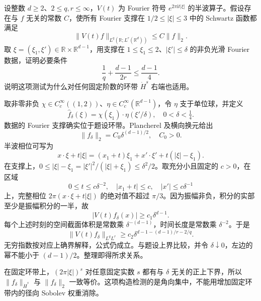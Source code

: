\begin{exercise}\label{b2:ex:app-E-2}
设整数 \(d\geq2\)、\(2\leq q,r\leq\infty\)，\(V(t)\) 为 Fourier 符号 \(e^{2\pi\mathrm it|\xi|}\) 的半波算子。假设存在与 \(f\) 无关的常数 \(C\)，使所有 Fourier 支撑在 \(1/2\leq|\xi|\leq3\) 中的 Schwartz 函数都满足
\[
 \|V(t)f\|_{L^q(\mathbb R;L^r(\mathbb R^d))}\leq C\|f\|_2.
\]
取 \(\xi=(\xi_1,\xi')\in\mathbb R\times\mathbb R^{d-1}\)，用支撑在 \(1\leq\xi_1\leq2\)、\(|\xi'|\leq\delta\) 的非负光滑 Fourier 数据，证明必要条件
\[
 \frac1q+\frac{d-1}{2r}\leq\frac{d-1}{4}.
\]
说明这项测试为什么对任何固定阶数的环带 \(\dot H^s\) 右端也适用。
\end{exercise}
\begin{solution}
取非零非负 \(\chi\in C_c^\infty((1,2))\)、\(\eta\in C_c^\infty(\mathbb R^{d-1})\)，令 \(\eta\) 支于单位球，并定义
\[
 \widehat f_\delta(\xi)=\chi(\xi_1)\cdot\eta(\xi'/\delta),
 \quad 0<\delta<\tfrac14.
\]
数据的 Fourier 支撑确实位于题设环带。Plancherel 及横向换元给出
\[
 \|f_\delta\|_2=C_0\delta^{(d-1)/2},\quad C_0>0.
\]
半波相位可写为
\[
 x\cdot\xi+t|\xi|
 =(x_1+t)\xi_1+x'\cdot\xi'
       +t(|\xi|-\xi_1).
\]
在支撑上，\(0\leq|\xi|-\xi_1=|\xi'|^2/(|\xi|+\xi_1)\leq\delta^2/2\)。取充分小且固定的 \(c>0\)，在区域
\[
 0\leq t\leq c\delta^{-2},\quad
 |x_1+t|\leq c,\quad |x'|\leq c\delta^{-1}
\]
上，完整相位 \(2\pi(x\cdot\xi+t|\xi|)\) 的绝对值不超过 \(\pi/3\)。因为振幅非负，积分的实部至少是振幅积分的一半，故
\[
 |V(t)f_\delta(x)|\geq c_1\delta^{d-1}.
\]
每个上述时刻的空间截面体积是常数乘 \(\delta^{-(d-1)}\)，时间长度是常数乘 \(\delta^{-2}\)。于是
\[
 \|V(t)f_\delta\|_{L^qL^r}
 \geq c_2\delta^{d-1-(d-1)/r-2/q}.
\]
无穷指数按对应上确界解释，公式仍成立。与题设上界比较，并令 \(\delta\downarrow0\)，左边的幂不能小于 \((d-1)/2\)。整理即得所求关系。

在固定环带上，\((2\pi|\xi|)^s\) 对任意固定实数 \(s\) 都有与 \(\delta\) 无关的正上下界，所以 \(\|f_\delta\|_{\dot H^s}\) 与 \(\|f_\delta\|_2\) 一致等价。这项构造检测的是角向集中，不能用增加固定环带内的径向 Sobolev 权重消除。
\end{solution}

